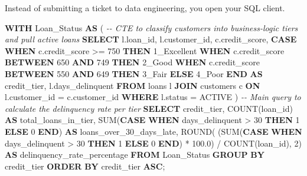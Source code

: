 \documentclass[
  11pt,
  openany,
  oneside]{book}
\newenvironment{Shaded}{}{}
\newcommand{\CommentTok}[1]{\textcolor[rgb]{0.38,0.63,0.69}{\textit{#1}}}
\newcommand{\ControlFlowTok}[1]{\textcolor[rgb]{0.00,0.44,0.13}{\textbf{#1}}}
\newcommand{\DecValTok}[1]{\textcolor[rgb]{0.25,0.63,0.44}{#1}}
\newcommand{\FloatTok}[1]{\textcolor[rgb]{0.25,0.63,0.44}{#1}}
\newcommand{\FunctionTok}[1]{\textcolor[rgb]{0.02,0.16,0.49}{#1}}
\newcommand{\KeywordTok}[1]{\textcolor[rgb]{0.00,0.44,0.13}{\textbf{#1}}}
\newcommand{\NormalTok}[1]{#1}
\newcommand{\OperatorTok}[1]{\textcolor[rgb]{0.40,0.40,0.40}{#1}}
\newcommand{\StringTok}[1]{\textcolor[rgb]{0.25,0.44,0.63}{#1}}
\begin{document}
Instead of submitting a ticket to data engineering, you open your SQL
client.

\begin{Shaded}
\begin{Highlighting}[]
\KeywordTok{WITH}\NormalTok{ Loan\_Status }\KeywordTok{AS}\NormalTok{ (}
    \CommentTok{{-}{-} CTE to classify customers into business{-}logic tiers and pull active loans}
    \KeywordTok{SELECT} 
\NormalTok{        l.loan\_id,}
\NormalTok{        l.customer\_id,}
\NormalTok{        c.credit\_score,}
        \ControlFlowTok{CASE} 
            \ControlFlowTok{WHEN}\NormalTok{ c.credit\_score }\OperatorTok{\textgreater{}=} \DecValTok{750} \ControlFlowTok{THEN} \StringTok{\textquotesingle{}1\_Excellent\textquotesingle{}}
            \ControlFlowTok{WHEN}\NormalTok{ c.credit\_score }\KeywordTok{BETWEEN} \DecValTok{650} \KeywordTok{AND} \DecValTok{749} \ControlFlowTok{THEN} \StringTok{\textquotesingle{}2\_Good\textquotesingle{}}
            \ControlFlowTok{WHEN}\NormalTok{ c.credit\_score }\KeywordTok{BETWEEN} \DecValTok{550} \KeywordTok{AND} \DecValTok{649} \ControlFlowTok{THEN} \StringTok{\textquotesingle{}3\_Fair\textquotesingle{}}
            \ControlFlowTok{ELSE} \StringTok{\textquotesingle{}4\_Poor\textquotesingle{}}
        \ControlFlowTok{END} \KeywordTok{AS}\NormalTok{ credit\_tier,}
\NormalTok{        l.days\_delinquent}
    \KeywordTok{FROM}\NormalTok{ loans l}
    \KeywordTok{JOIN}\NormalTok{ customers c }\KeywordTok{ON}\NormalTok{ l.customer\_id }\OperatorTok{=}\NormalTok{ c.customer\_id}
    \KeywordTok{WHERE}\NormalTok{ l.status }\OperatorTok{=} \StringTok{\textquotesingle{}ACTIVE\textquotesingle{}}
\NormalTok{)}
\CommentTok{{-}{-} Main query to calculate the delinquency rate per tier}
\KeywordTok{SELECT} 
\NormalTok{    credit\_tier,}
    \FunctionTok{COUNT}\NormalTok{(loan\_id) }\KeywordTok{AS}\NormalTok{ total\_loans\_in\_tier,}
    \FunctionTok{SUM}\NormalTok{(}\ControlFlowTok{CASE} \ControlFlowTok{WHEN}\NormalTok{ days\_delinquent }\OperatorTok{\textgreater{}} \DecValTok{30} \ControlFlowTok{THEN} \DecValTok{1} \ControlFlowTok{ELSE} \DecValTok{0} \ControlFlowTok{END}\NormalTok{) }\KeywordTok{AS}\NormalTok{ loans\_over\_30\_days\_late,}
    \FunctionTok{ROUND}\NormalTok{(}
\NormalTok{        (}\FunctionTok{SUM}\NormalTok{(}\ControlFlowTok{CASE} \ControlFlowTok{WHEN}\NormalTok{ days\_delinquent }\OperatorTok{\textgreater{}} \DecValTok{30} \ControlFlowTok{THEN} \DecValTok{1} \ControlFlowTok{ELSE} \DecValTok{0} \ControlFlowTok{END}\NormalTok{) }\OperatorTok{*} \FloatTok{100.0}\NormalTok{) }\OperatorTok{/} \FunctionTok{COUNT}\NormalTok{(loan\_id), }
    \DecValTok{2}\NormalTok{) }\KeywordTok{AS}\NormalTok{ delinquency\_rate\_percentage}
\KeywordTok{FROM}\NormalTok{ Loan\_Status}
\KeywordTok{GROUP} \KeywordTok{BY}\NormalTok{ credit\_tier}
\KeywordTok{ORDER} \KeywordTok{BY}\NormalTok{ credit\_tier }\KeywordTok{ASC}\NormalTok{;}
\end{Highlighting}
\end{Shaded}
\end{document}
